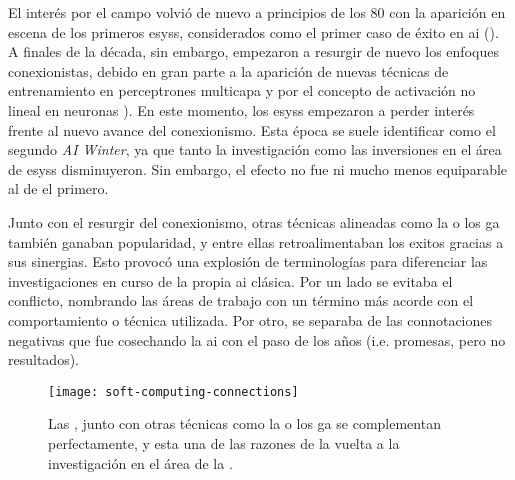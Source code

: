 El interés por el campo volvió de nuevo a principios de los $80$ con la aparición en escena de los primeros \acp{esys}, considerados como el primer caso de éxito en \ac{ai} (\cite{russell2003artificial}). A finales de la década, sin embargo, empezaron a resurgir de nuevo los enfoques conexionistas, debido en gran parte a la aparición de nuevas técnicas de entrenamiento en perceptrones multicapa y por el concepto de activación no lineal en neuronas \cite{rumelhart1985learning, cybenko1989approximation}). En este momento, los \acp{esys} empezaron a perder interés frente al nuevo avance del conexionismo. Esta época se suele identificar como el segundo \textit{AI Winter}, ya que tanto la investigación como las inversiones en el área de \acp{esys} disminuyeron. Sin embargo, el efecto no fue ni mucho menos equiparable al de el primero.

Junto con el resurgir del conexionismo, otras técnicas alineadas como la  o los \Acrfull{ga} también ganaban popularidad, y entre ellas retroalimentaban los exitos gracias a sus sinergias. Esto provocó una explosión de terminologías para diferenciar las investigaciones en curso de la propia \gls{ai} clásica. Por un lado se evitaba el conflicto, nombrando las áreas de trabajo con un término más acorde con el comportamiento o técnica utilizada. Por otro, se separaba de las connotaciones negativas que fue cosechando la \gls{ai} con el paso de los años (i.e. promesas, pero no resultados).

\begin{figure}[!b]
	\texttt{[image: soft-computing-connections]}
	\caption[Sinergias entre técnicas del \gls{sc}]{Las , junto con otras técnicas como la  o los \Acrfull{ga} se complementan perfectamente, y esta una de las razones de la vuelta a la investigación en el área de la .}
	\label{fig:soft-computing-connections}
\end{figure}

